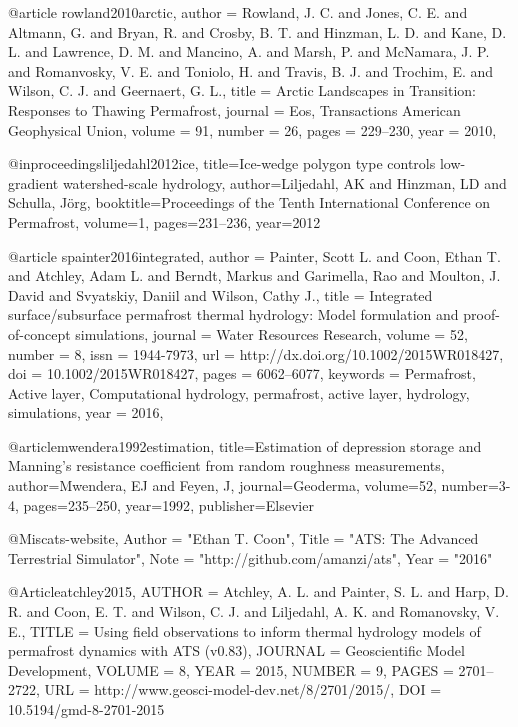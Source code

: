 \begin{thebibliography}{}
@article {rowland2010arctic,
author = {Rowland, J. C. and Jones, C. E. and Altmann, G. and Bryan, R. and Crosby, B. T. and Hinzman, L. D. and Kane, D. L. and Lawrence, D. M. and Mancino, A. and Marsh, P. and McNamara, J. P. and Romanvosky, V. E. and Toniolo, H. and Travis, B. J. and Trochim, E. and Wilson, C. J. and Geernaert, G. L.},
title = {Arctic Landscapes in Transition: Responses to Thawing Permafrost},
journal = {Eos, Transactions American Geophysical Union},
volume = {91},
number = {26},
pages = {229--230},
year = {2010},
}

@inproceedings{liljedahl2012ice,
  title={Ice-wedge polygon type controls low-gradient watershed-scale hydrology},
  author={Liljedahl, AK and Hinzman, LD and Schulla, J{\"o}rg},
  booktitle={Proceedings of the Tenth International Conference on Permafrost},
  volume={1},
  pages={231--236},
  year={2012}
}


@article {spainter2016integrated, 
author = {Painter, Scott L. and Coon, Ethan T. and Atchley, Adam L. and Berndt, Markus and Garimella, Rao and Moulton, J. David and Svyatskiy, Daniil and Wilson, Cathy J.},
title = {Integrated surface/subsurface permafrost thermal hydrology: Model formulation and proof-of-concept simulations},
journal = {Water Resources Research},
volume = {52},
number = {8},
issn = {1944-7973},
url = {http://dx.doi.org/10.1002/2015WR018427},
doi = {10.1002/2015WR018427},
pages = {6062--6077},
keywords = {Permafrost, Active layer, Computational hydrology, permafrost, active layer, hydrology, simulations},
year = {2016},
}

@article{mwendera1992estimation,
  title={Estimation of depression storage and Manning's resistance coefficient from random roughness measurements},
  author={Mwendera, EJ and Feyen, J},
  journal={Geoderma},
  volume={52},
  number={3-4},
  pages={235--250},
  year={1992},
  publisher={Elsevier}
}

@Misc{ats-website, Author = "Ethan T. Coon", Title = "{ATS}: The {A}dvanced {T}errestrial {S}imulator", Note = "{h}ttp://github.com/amanzi/ats", Year = "2016" }


@Article{atchley2015,
AUTHOR = {Atchley, A. L. and Painter, S. L. and Harp, D. R. and Coon, E. T. and Wilson, C. J. and Liljedahl, A. K. and Romanovsky, V. E.},
TITLE = {Using field observations to inform thermal hydrology models of permafrost dynamics with ATS (v0.83)},
JOURNAL = {Geoscientific Model Development},
VOLUME = {8},
YEAR = {2015},
NUMBER = {9},
PAGES = {2701--2722},
URL = {http://www.geosci-model-dev.net/8/2701/2015/},
DOI = {10.5194/gmd-8-2701-2015}
}



\end{thebibliography}
